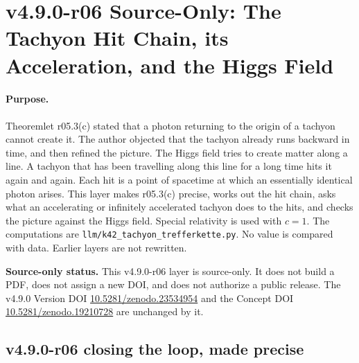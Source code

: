 \clearpage
\section*{v4.9.0-r06 Source-Only: The Tachyon Hit Chain, its Acceleration, and the Higgs Field}
\label{sec:v490-r06-hit-chain-higgs}

\paragraph{Purpose.}
Theoremlet r05.3(c) stated that a photon returning to the origin of a tachyon cannot create it.  The author objected that the
tachyon already runs backward in time, and then refined the picture.  The Higgs field tries to create matter along a line.
A tachyon that has been travelling along this line for a long time hits it again and again.  Each hit is a point of
spacetime at which an essentially identical photon arises.  This layer makes r05.3(c) precise, works out the hit chain,
asks what an accelerating or infinitely accelerated tachyon does to the hits, and checks the picture against the Higgs
field.  Special relativity is used with \(c=1\).  The computations are \texttt{llm/k42\_tachyon\_trefferkette.py}.  No
value is compared with data.  Earlier layers are not rewritten.

\noindent\textbf{Source-only status.}
This v4.9.0-r06 layer is source-only.  It does not build a PDF, does not assign a new DOI,
and does not authorize a public release.  The v4.9.0 Version DOI
\href{https://doi.org/10.5281/zenodo.23534954}{10.5281/zenodo.23534954} and the Concept DOI
\href{https://doi.org/10.5281/zenodo.19210728}{10.5281/zenodo.19210728} are unchanged by it.

\subsection*{v4.9.0-r06 closing the loop, made precise}
\label{subsec:v490-r06-loop}

